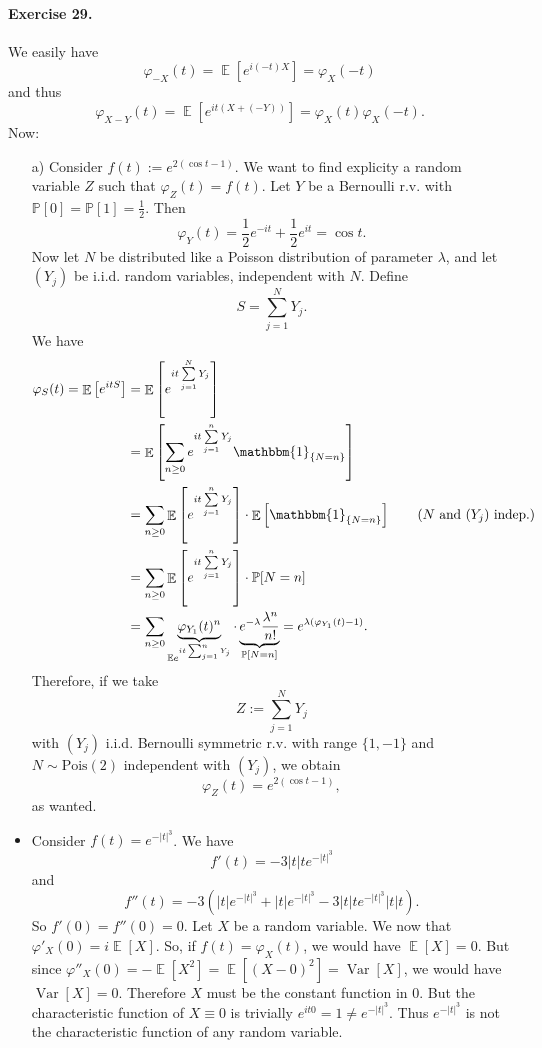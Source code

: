 \documentclass[12pt,a4paper]{report}
\theoremstyle{definition}
\theoremstyle{num.custom-title}
\DeclareMathOperator{\E}{\mathbb{E}}
\DeclareMathOperator{\Var}{Var}
\renewcommand{\phi}{\varphi}
\renewcommand{\P}{\mathbb{P}}
\renewcommand{\1}{\mathbbm{1}}
\begin{document}
\paragraph{Exercise 29.} We easily have
\[
\phi_{-X}(t) = \E \left[ e^{i(-t)X} \right] = \phi_X(-t)
\]
and thus
\[
\phi_{X-Y}(t) = \E \left[ e^{it(X+(-Y))} \right] = \phi_X(t) \phi_X(-t).
\]
Now:
\begin{itemize}
\item[a)] Consider $f(t):=e^{2(\cos t -1)}$. We want to find explicity a random variable $Z$ such that $\phi_Z(t)=f(t)$. Let $Y$ be a Bernoulli r.v. with $\P[0]=\P[1]=\frac{1}{2}$. Then
\[
\phi_Y(t)=\frac{1}{2} e^{-it} + \frac{1}{2} e^{it} = \cos t.
\]
Now let $N$ be distributed like a Poisson distribution of parameter $\lambda$, and let $(Y_j)$ be i.i.d. random variables, independent with $N$. Define 
\[
S=\sum_{j=1}^N Y_j.
\]
We have 
\begin{align*}
\phi_S(t)= \E \left[ e^{itS} \right] 
&= \E \left[ e^{it \sum\limits_{j=1}^N Y_j} \right] \\
&= \E \left[ \sum_{n \geq 0} e^{it \sum\limits_{j=1}^n Y_j} \1_{\{N=n\}} \right] \\
&= \sum_{n \geq 0} \E \left[ e^{it \sum\limits_{j=1}^n Y_j} \right] \cdot \E \left[ \1_{\{N=n\}} \right] \tag{$N$ and $(Y_j)$ indep.} \\
&= \sum_{n \geq 0} \E \left[ e^{it \sum\limits_{j=1}^n Y_j} \right] \cdot \P[N=n] \\
&= \sum_{n \geq 0} \underbrace{\phi_{Y_1}(t)^n}_{\mathbb{E}e^{it \sum_{j=1}^n Y_j}} \cdot \underbrace{e^{-\lambda} \frac{\lambda^n}{n!}}_{\P[N=n]}= e^{\lambda(\phi_{Y_1}(t)-1)}.
\end{align*}
Therefore, if we take
\[
Z:= \sum_{j=1}^N Y_j
\]
with $(Y_j)$ i.i.d. Bernoulli symmetric r.v. with range $\{1,-1\}$ and $N \sim \text{Pois}(2)$ independent with $(Y_j)$, we obtain 
\[
\phi_Z(t) = e^{2(\cos t -1)},
\]
as wanted.
\item Consider $f(t)=e^{-|t|^3}$. We have
\[
f'(t)=-3|t|te^{-|t|^3}
\]
and
\[
f''(t)= -3 \left( |t|e^{-|t|^3} + |t|e^{-|t|^3} -3|t|te^{-|t|^3}|t|t \right).
\]
So $f'(0)=f''(0)=0$. Let $X$ be a random variable. We now that $\phi'_X(0)=i\E[X]$. So, if $f(t)=\phi_X(t)$, we would have $\E[X]=0$. But since $\phi''_X(0)=-\E[X^2]=\E[(X-0)^2]=\Var[X]$, we would have $\Var[X]=0$. Therefore $X$ must be the constant function in $0$. But the characteristic function of $X \equiv 0$ is trivially $e^{it0}=1 \neq e^{-|t|^3}$. Thus $e^{-|t|^3}$ is not the characteristic function of any random variable.
\end{itemize}
\end{document}
